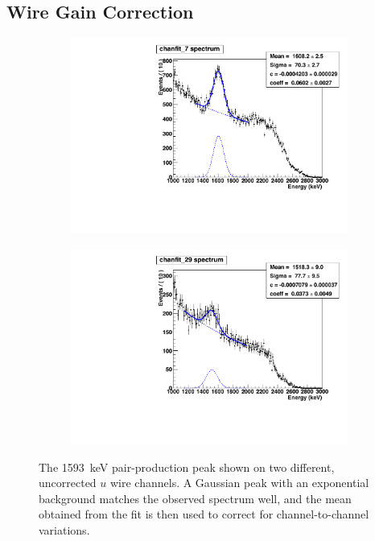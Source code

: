 \documentclass[herrin-thesis.tex]{subfiles}
\begin{document}
\subsection{Wire Gain Correction}
\begin{figure}[htbp]
	\begin{subfigure}[t]{0.48\textwidth}
		\centering
		\includegraphics[width=\textwidth]{./plots/data_wiregain_pp07.pdf}
	\end{subfigure}\hfill%
	\begin{subfigure}[t]{0.48\textwidth}
		\centering
		\includegraphics[width=\textwidth]{./plots/data_wiregain_pp29.pdf}
	\end{subfigure}
	\caption[The pair-production peak on individual \(u\) wire channels]{The \SI{1593}{\keV} pair-production peak shown on two different, uncorrected \(u\) wire channels. A Gaussian peak with an exponential background matches the observed spectrum well, and the mean obtained from the fit is then used to correct for channel-to-channel variations.}
	\label{fig:data_wiregain_pp}
\end{figure}
\end{document}
